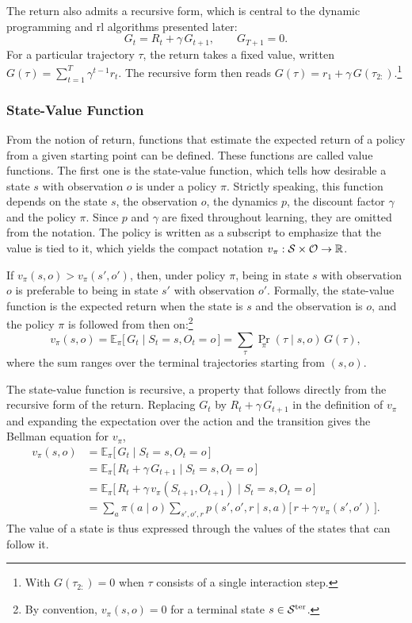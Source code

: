 The return also admits a recursive form, which is central to the dynamic programming and \gls{rl} algorithms presented later:
\[
G_t = R_t + \gamma \, G_{t+1}, \qquad G_{T+1} = 0.
\]
For a particular trajectory \(\tau\), the return takes a fixed value, written \(G(\tau) = \sum_{t=1}^{T} \gamma^{t-1} r_t\).
The recursive form then reads \(G(\tau) = r_1 + \gamma \, G(\tau_{2:})\).\footnote{With \(G(\tau_{2:}) = 0\) when \(\tau\) consists of a single interaction step.}

\subsubsection{State-Value Function}
\label{subsubsec:state_value_function}

From the notion of return, functions that estimate the expected return of a policy from a given starting point can be defined.
These functions are called value functions.
The first one is the state-value function, which tells how desirable a state \(s\) with observation \(o\) is under a policy \(\pi\).
Strictly speaking, this function depends on the state \(s\), the observation \(o\), the dynamics \(p\), the discount factor \(\gamma\) and the policy \(\pi\).
Since \(p\) and \(\gamma\) are fixed throughout learning, they are omitted from the notation.
The policy is written as a subscript to emphasize that the value is tied to it, which yields the compact notation \(v_\pi : \mathcal{S} \times \mathcal{O} \to \mathbb{R}\).

If \(v_\pi(s, o) > v_\pi(s', o')\), then, under policy \(\pi\), being in state \(s\) with observation \(o\) is preferable to being in state \(s'\) with observation \(o'\).
Formally, the state-value function is the expected return when the state is \(s\) and the observation is \(o\), and the policy \(\pi\) is followed from then on:\footnote{By convention, \(v_\pi(s, o) = 0\) for a terminal state \(s \in \mathcal{S}^{\mathrm{ter}}\).}
\[
v_\pi(s, o) = \mathbb{E}_\pi\big[\, G_t \mid S_t = s, O_t = o \,\big] = \sum_{\tau} \Pr_\pi(\tau \mid s, o) \, G(\tau),
\]
where the sum ranges over the terminal trajectories starting from \((s, o)\).

The state-value function is recursive, a property that follows directly from the recursive form of the return.
Replacing \(G_t\) by \(R_t + \gamma \, G_{t+1}\) in the definition of \(v_\pi\) and expanding the expectation over the action and the transition gives the Bellman equation for \(v_\pi\),
\[
\begin{aligned}
v_\pi(s, o)
&= \mathbb{E}_\pi\big[\, G_t \mid S_t = s, O_t = o \,\big] \\[4pt]
&= \mathbb{E}_\pi\big[\, R_t + \gamma \, G_{t+1} \mid S_t = s, O_t = o \,\big] \\[4pt]
&= \mathbb{E}_\pi\big[\, R_t + \gamma \, v_\pi(S_{t+1}, O_{t+1}) \mid S_t = s, O_t = o \,\big] \\[4pt]
&= \sum_{a} \pi(a \mid o) \sum_{s', o', r} p(s', o', r \mid s, a) \Big[\, r + \gamma \, v_\pi(s', o') \,\Big].
\end{aligned}
\]
The value of a state is thus expressed through the values of the states that can follow it.

